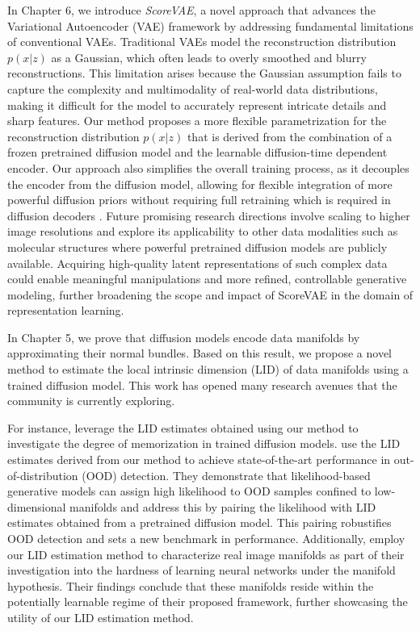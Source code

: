 In Chapter 6, we introduce \emph{ScoreVAE}, a novel approach that advances the Variational Autoencoder (VAE) framework by addressing fundamental limitations of conventional VAEs. Traditional VAEs model the reconstruction distribution $p(x|z)$ as a Gaussian, which often leads to overly smoothed and blurry reconstructions. This limitation arises because the Gaussian assumption fails to capture the complexity and multimodality of real-world data distributions, making it difficult for the model to accurately represent intricate details and sharp features. Our method proposes a more flexible parametrization for the reconstruction distribution $p(x|z)$ that is derived from the combination of a frozen pretrained diffusion model and the learnable diffusion-time dependent encoder. Our approach also simplifies the overall training process, as it decouples the encoder from the diffusion model, allowing for flexible integration of more powerful diffusion priors without requiring full retraining which is required in diffusion decoders \cite{preechakul2022diffusion_decoder}. Future promising research directions involve scaling to higher image resolutions and explore its applicability to other data modalities such as molecular structures where powerful pretrained diffusion models are publicly available. Acquiring high-quality latent representations of such complex data could enable meaningful manipulations and more refined, controllable generative modeling, further broadening the scope and impact of ScoreVAE in the domain of representation learning.

In Chapter 5, we prove that diffusion models encode data manifolds by approximating their normal bundles. Based on this result, we propose a novel method to estimate the local intrinsic dimension (LID) of data manifolds using a trained diffusion model. This work has opened many research avenues that the community is currently exploring.

For instance, \citet{achilli2024losing} leverage the LID estimates obtained using our method to investigate the degree of memorization in trained diffusion models. \citet{kamkari2024geometric} use the LID estimates derived from our method to achieve state-of-the-art performance in out-of-distribution (OOD) detection. They demonstrate that likelihood-based generative models can assign high likelihood to OOD samples confined to low-dimensional manifolds and address this by pairing the likelihood with LID estimates obtained from a pretrained diffusion model. This pairing robustifies OOD detection and sets a new benchmark in performance. Additionally, \citet{kiani2024hardness} employ our LID estimation method to characterize real image manifolds as part of their investigation into the hardness of learning neural networks under the manifold hypothesis. Their findings conclude that these manifolds reside within the potentially learnable regime of their proposed framework, further showcasing the utility of our LID estimation method.

